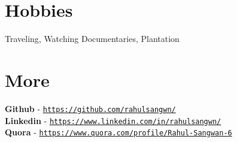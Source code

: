 \documentclass[margin, centered]{res}
\begin{document}
\begin{resume}
\begin{itemize}[leftmargin=*]
\end{itemize}
\vspace{3mm}



\section{Hobbies}
Traveling, Watching Documentaries, Plantation
\vspace{3mm}


\section{More}
\textbf{Github} - \href{https://github.com/rahulsangwn}{\texttt{https://github.com/rahulsangwn/}} \\
\textbf{Linkedin} - \href{https://www.linkedin.com/in/rahulsangwn/}{\texttt{https://www.linkedin.com/in/rahulsangwn/}} \\
\textbf{Quora} - \href{https://www.quora.com/profile/Rahul-Sangwan-6}{\texttt{https://www.quora.com/profile/Rahul-Sangwan-6}}


\end{resume}
\end{document}
